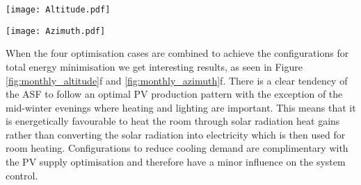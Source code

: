 
\begin{figure*}
\begin{center}
\texttt{[image: Altitude.pdf]}
\caption{Carpet plots detailing the optimal altitude angles to minimise the heating demand(a), cooling demand (b), lighting demand (c), and maximise PV electricity production (d). (e) details the combinations for optimum building thermal management without PV production, (f) also includes the PV production. Small angles correspond to closed positions, whereas large angles represent open positions. The corresponding azimuth angles for each hour are shown in Figure \ref{fig:monthly_azimuth}.}
\label{fig:monthly_altitude}
\end{center}
\end{figure*}

\begin{figure*}
\begin{center}
\texttt{[image: Azimuth.pdf]}
\caption{Carpet plots detailing the optimal azimuth angles to minimise the heating demand (a), cooling demand (b), lighting demand (c), and maximise PV electricity production (d). (e) details the combinations for optimum building thermal management without PV production, (f) also includes the PV production. Negative angles correspond to the panels facing west, whereas positive angles represent east-facing panels. The corresponding altitude angles for each hour are shown in Figure \ref{fig:monthly_altitude}.}
\label{fig:monthly_azimuth}
\end{center}
\end{figure*}



When the four optimisation cases are combined to achieve the configurations for total energy minimisation we get interesting results, as seen in Figure \ref{fig:monthly_altitude}f and \ref{fig:monthly_azimuth}f. There is a clear tendency of the ASF to follow an optimal PV production pattern with the exception of the mid-winter evenings where heating and lighting are important. This means that it is energetically favourable to heat the room through solar radiation heat gains rather than converting the solar radiation into electricity which is then used for room heating. Configurations to reduce cooling demand are complimentary with the PV supply optimisation and therefore have a minor influence on the system control. 


